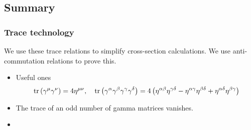 \subsection*{Summary}

\subsubsection*{Trace technology}
We use these trace relations 
to simplify cross-section calculations. 
We use anti-commutation relations to 
prove this. 
\begin{itemize}
	\item Useful ones 
	\[
		\tr\left( \gamma ^ \mu \gamma ^ \nu  \right)   = 4 \eta ^{ \mu \nu }, \quad \tr \left( \gamma ^ \alpha 
		\gamma ^ \beta \gamma ^ \gamma \gamma ^ \delta \right)   = 4 \left( \eta ^{ \alpha \beta } \eta ^{ \gamma \delta } 
	 - \eta ^{ \alpha \gamma } \eta ^{ \beta \delta } 
 + \eta ^{ \alpha \delta } \eta ^{ \beta \gamma } \right) 
	\] 
\item The trace of an odd number of gamma matrices vanishes. 
\item 
\end{itemize}


